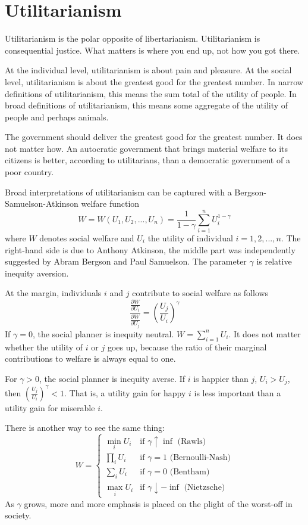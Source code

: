 \section{Utilitarianism}
Utilitarianism is the polar opposite of libertarianism. Utilitarianism is consequential justice. What matters is where you end up, not how you got there.

At the individual level, utilitarianism is about pain and pleasure. At the social level, utilitarianism is about the greatest good for the greatest number. In narrow definitions of utilitarianism, this means the sum total of the utility of people. In broad definitions of utilitarianism, this means some aggregate of the utility of people and perhaps animals.

The government should deliver the greatest good for the greatest number. It does not matter how. An autocratic government that brings material welfare to its citizens is better, according to utilitarians, than a democratic government of a poor country.

Broad interpretations of utilitarianism can be captured with a Bergson-Samuelson-Atkinson welfare function
\begin{equation}
\label{eq:Bergson}
    W = W(U_1, U_2, ..., U_n) = \frac{1}{1-\gamma} \sum_{i=1}^n U_i^{1-\gamma}
\end{equation}
where $W$ denotes social welfare and $U_i$ the utility of individual $i=1,2, ..., n$. The right-hand side is due to Anthony Atkinson, the middle part was independently suggested by Abram Bergson and Paul Samuelson. The parameter $\gamma$ is relative inequity aversion.

At the margin, individuals $i$ and $j$ contribute to social welfare as follows
\begin{equation}
    \frac{\frac{\partial W}{\partial U_i}}{\frac{\partial W}{\partial U_j}} = \left (\frac{U_j}{U_i} \right )^\gamma
\end{equation}
If $\gamma=0$, the social planner is inequity neutral. $W=\sum_{i=1}^n U_i$. It does not matter whether the utility of $i$ or $j$ goes up, because the ratio of their marginal contributions to welfare is always equal to one.

For $\gamma>0$, the social planner is inequity averse. If $i$ is happier than $j$, $U_i > U_j$, then $\left (\frac{U_j}{U_i} \right )^\gamma < 1$. That is, a utility gain for happy $i$ is less important than a utility gain for miserable $i$.

There is another way to see the same thing:
\begin{equation}
\label{eq:Atkinson}
    W = \begin{cases}
    \min_i U_i & \text{if } \gamma \uparrow \inf \text{ (Rawls)}\\
    \prod_i U_i & \text{if } \gamma=1 \text{ (Bernoulli-Nash)}\\
    \sum_i U_i & \text{if } \gamma=0 \text{ (Bentham)}\\
    \max_i U_i & \text{if } \gamma \downarrow -\inf \text{ (Nietzsche)}
\end{cases}
\end{equation}
As $\gamma$ grows, more and more emphasis is placed on the plight of the worst-off in society.


